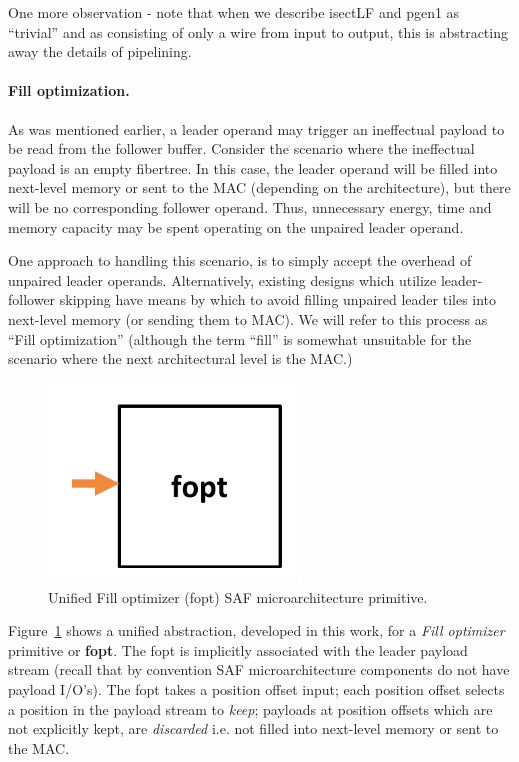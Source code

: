 One more observation - note that when we describe isectLF and pgen1 as ``trivial'' and as consisting of only a wire from input to output, this is abstracting away the details of pipelining.

\paragraph{Fill optimization.} As was mentioned earlier, a leader operand may trigger an ineffectual payload to be read from the follower buffer. Consider the scenario where the ineffectual payload is an empty fibertree. In this case, the leader operand will be filled into next-level memory or sent to the MAC (depending on the architecture), but there will be no corresponding follower operand. Thus, unnecessary energy, time and memory capacity may be spent operating on the unpaired leader operand.

One approach to handling this scenario, is to simply accept the overhead of unpaired leader operands. Alternatively, existing designs which utilize leader-follower skipping\cite{eyerissv2}\cite{gamma} have means by which to avoid filling unpaired leader tiles into next-level memory (or sending them to MAC). We will refer to this process as ``Fill optimization'' (although the term ``fill'' is somewhat unsuitable for the scenario where the next architectural level is the MAC.)

\begin{figure}[ht]
    \centering
    \includegraphics[width=0.6\textwidth]{figures/uniform_fopt.pdf}
    \caption{Unified Fill optimizer (fopt) SAF microarchitecture primitive.}
    \label{fig:uniform_fopt}
\end{figure}

Figure~\ref{fig:uniform_fopt} shows a unified abstraction, developed in this work, for a \textit{Fill optimizer} primitive or \textbf{fopt}. The fopt is implicitly associated with the leader payload stream (recall that by convention SAF microarchitecture components do not have payload I/O's). The fopt takes a position offset input; each position offset selects a position in the payload stream to \textit{keep}; payloads at position offsets which are not explicitly kept, are \textit{discarded} i.e. not filled into next-level memory or sent to the MAC.

